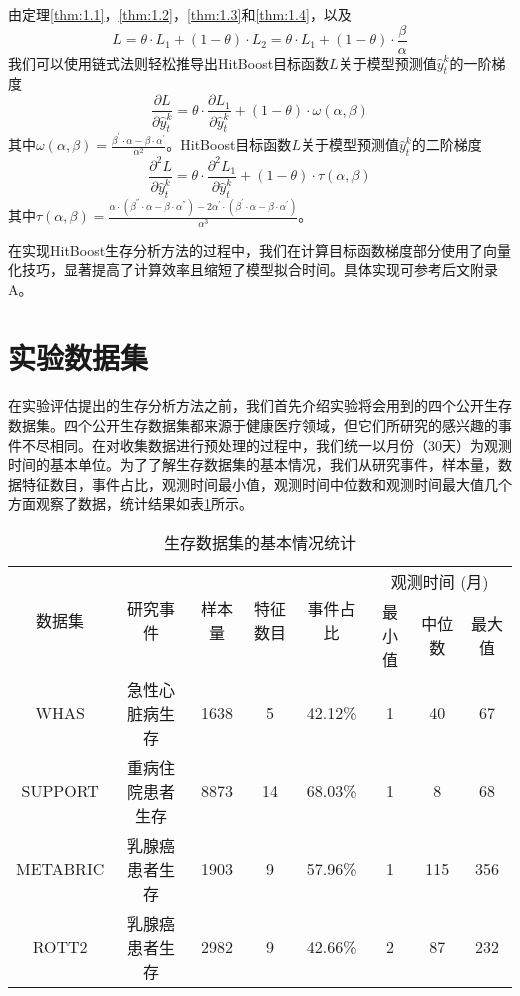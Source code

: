 由定理\ref{thm:1.1}，\ref{thm:1.2}，\ref{thm:1.3}和\ref{thm:1.4}，以及
\begin{equation}
L=\theta\cdot L_1 + (1-\theta)\cdot L_2= \theta\cdot L_1 + (1-\theta)\cdot \frac{\beta}{\alpha}
\end{equation} 
我们可以使用链式法则轻松推导出HitBoost目标函数$L$关于模型预测值$\hat{y}_t^k$的一阶梯度
\begin{equation}
\frac{\partial L}{\partial \hat{y}_t^k}=\theta\cdot \frac{\partial L_1}{\partial \hat{y}_t^k} + (1-\theta)\cdot \omega(\alpha, \beta)
\end{equation}
其中$\omega(\alpha, \beta)=\frac{\beta^{'}\cdot \alpha - \beta\cdot \alpha^{'}}{\alpha^2}$。HitBoost目标函数$L$关于模型预测值$\hat{y}_t^k$的二阶梯度
\begin{equation}
\frac{\partial^2 L}{\partial \hat{y}_t^k}=\theta\cdot \frac{\partial^2 L_1}{\partial \hat{y}_t^k} + (1-\theta)\cdot \tau(\alpha, \beta)
\end{equation} 
其中$\tau(\alpha, \beta)=\frac{\alpha\cdot (\beta^{''}\cdot \alpha - \beta\cdot \alpha^{''})-2\alpha^{'}\cdot (\beta^{'}\cdot \alpha - \beta\cdot \alpha^{'})}{\alpha^3}$。

在实现HitBoost生存分析方法的过程中，我们在计算目标函数梯度部分使用了向量化技巧，显著提高了计算效率且缩短了模型拟合时间。具体实现可参考后文附录A。

\section{实验数据集}

在实验评估提出的生存分析方法之前，我们首先介绍实验将会用到的四个公开生存数据集。四个公开生存数据集都来源于健康医疗领域，但它们所研究的感兴趣的事件不尽相同。在对收集数据进行预处理的过程中，我们统一以月份（30天）为观测时间的基本单位。为了了解生存数据集的基本情况，我们从研究事件，样本量，数据特征数目，事件占比，观测时间最小值，观测时间中位数和观测时间最大值几个方面观察了数据，统计结果如表\ref{table01}所示。

\begin{table}[H]
\caption{生存数据集的基本情况统计}
\begin{tabular}{cccccccc}
\toprule
\multirow{2}{*}{数据集} & \multirow{2}{*}{研究事件} & \multirow{2}{*}{样本量} & \multirow{2}{*}{特征数目} & \multirow{2}{*}{事件占比} & \multicolumn{3}{c}{观测时间 (月)} \\ \cline{6-8} 
&  &  &  &  & 最小值 & 中位数 & 最大值 \\ 
\midrule
WHAS & 急性心脏病生存 & 1638 & 5 & 42.12\% & 1 & 40 & 67 \\
SUPPORT & 重病住院患者生存 & 8873 & 14 & 68.03\% & 1 & 8 & 68 \\
METABRIC & 乳腺癌患者生存 & 1903 & 9 & 57.96\% & 1 & 115 & 356 \\
ROTT2 & 乳腺癌患者生存 & 2982 & 9 & 42.66\% & 2 & 87 & 232 \\
\bottomrule
\end{tabular}
\label{table01}
\end{table}


